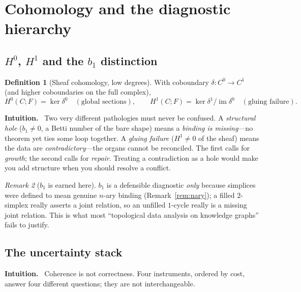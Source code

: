 \documentclass[11pt]{article}
\theoremstyle{definition}
\newtheorem{definition}{Definition}[section]
\theoremstyle{plain}
\theoremstyle{remark}
\newtheorem{remark}[definition]{Remark}
\newcommand{\Intu}{\noindent\textbf{\color{intuitioncol}Intuition.}\ }
\newcommand{\CC}{C}                 %
\newcommand{\Fs}{F}                 %
\newcommand{\im}{\operatorname{im}}
\newcommand{\Hzero}{H^{0}}
\newcommand{\Hone}{H^{1}}
\begin{document}
\section{Cohomology and the diagnostic hierarchy}\label{sec:cohom}

\subsection{\texorpdfstring{$\Hzero$, $\Hone$}{H0, H1} and the \texorpdfstring{$b_1$}{b1} distinction}\label{subsec:cohom}

\begin{definition}[Sheaf cohomology, low degrees]
With coboundary $\delta:C^0\to C^1$ (and higher coboundaries on the full complex),
\[
\Hzero(\CC;\Fs)=\ker\delta^0\quad(\text{global sections}),\qquad
\Hone(\CC;\Fs)=\ker\delta^1/\im\delta^0\quad(\text{gluing failure}).
\]
\end{definition}

\begin{intu}\Intu
Two very different pathologies must never be confused. A \emph{structural hole}
($b_1\neq0$, a Betti number of the bare shape) means a \emph{binding is missing}---no
theorem yet ties some loop together. A \emph{gluing failure} ($\Hone\neq0$ of the
sheaf) means the data are \emph{contradictory}---the organs cannot be reconciled. The
first calls for \emph{growth}; the second calls for \emph{repair}. Treating a
contradiction as a hole would make you add structure when you should resolve a
conflict.
\end{intu}

\begin{remark}[$b_1$ is earned here]
$b_1$ is a defensible diagnostic \emph{only} because simplices were defined to mean
genuine $n$-ary binding (Remark~\ref{rem:nary}); a filled $2$-simplex really asserts a
joint relation, so an unfilled $1$-cycle really is a missing joint relation. This is
what most ``topological data analysis on knowledge graphs'' fails to justify.
\end{remark}

\subsection{The uncertainty stack}\label{sec:uncert}

\begin{intu}\Intu
Coherence is not correctness. Four instruments, ordered by cost, answer four different
questions; they are not interchangeable.
\end{intu}
\end{document}
